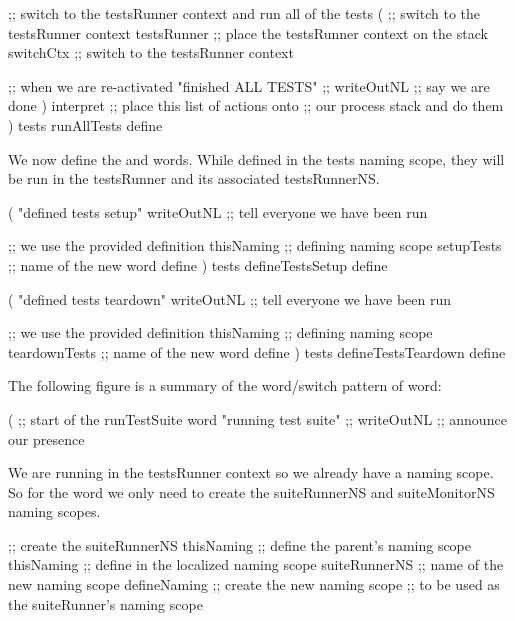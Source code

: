 \startJoylolCode
  ;; switch to the testsRunner context and run all of the tests
  (
    ;; switch to the testsRunner context
    testsRunner ;; place the testsRunner context on the stack
    switchCtx   ;; switch to the testsRunner context
    
    ;; when we are re-activated
    "finished ALL TESTS"  ;;
    writeOutNL            ;; say we are done
  )
  interpret     ;; place this list of actions onto
                ;; our process stack and do them
)
tests
runAllTests
define
\stopJoylolCode

We now define the  and  
words. While defined in the tests naming scope, they will be run in the 
testsRunner and its associated testsRunnerNS. 

\startJoylolCode
(
  "defined tests setup"
  writeOutNL  ;; tell everyone we have been run
  
              ;; we use the provided definition
  thisNaming  ;; defining naming scope
  setupTests  ;; name of the new word
  define
)
tests
defineTestsSetup
define
\stopJoylolCode

\startJoylolCode
(
  "defined tests teardown"
  writeOutNL    ;; tell everyone we have been run
  
                ;; we use the provided definition
  thisNaming    ;; defining naming scope
  teardownTests ;; name of the new word
  define
)
tests
defineTestsTeardown
define
\stopJoylolCode

\stopTestSuite



The following figure is a summary of the word/switch pattern of 
 word: 


\startJoylolCode
(                       ;; start of the runTestSuite word
  "running test suite"  ;;
  writeOutNL            ;; announce our presence
\stopJoylolCode

We are running in the testsRunner context so we already have a 
 naming scope. So for the  word we 
only need to create the suiteRunnerNS and suiteMonitorNS naming scopes. 

\startJoylolCode
  ;; create the suiteRunnerNS
  thisNaming    ;; define the parent's naming scope
  thisNaming    ;; define in the localized naming scope
  suiteRunnerNS ;; name of the new naming scope
  defineNaming  ;; create the new naming scope
                ;; to be used as the suiteRunner's naming scope
\stopJoylolCode

